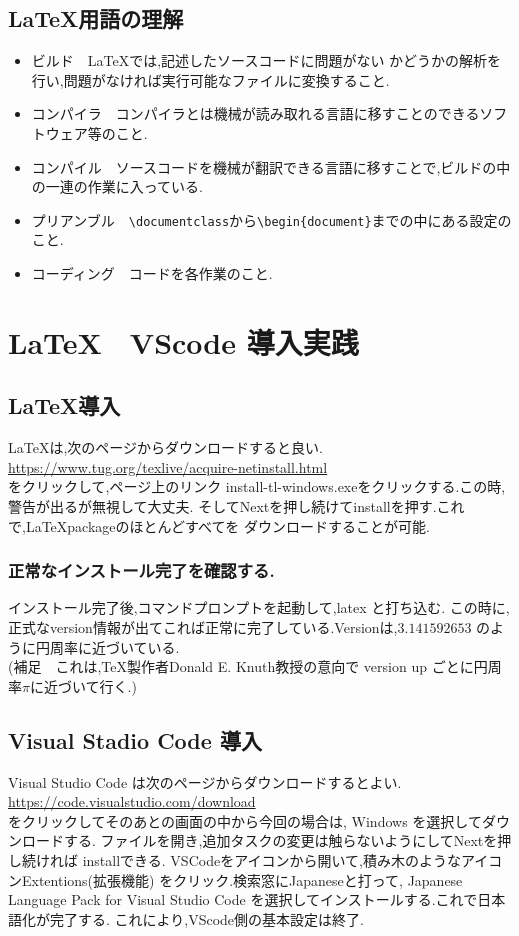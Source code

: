 \documentclass{ltjsarticle}
\begin{document}
\subsection{\LaTeX 用語の理解}
\begin{itemize}
  \item ビルド　\LaTeX では,記述したソースコードに問題がない
        かどうかの解析を行い,問題がなければ実行可能なファイルに変換すること.
  \item コンパイラ　コンパイラとは機械が読み取れる言語に移すことのできるソフトウェア等のこと.
  \item コンパイル　ソースコードを機械が翻訳できる言語に移すことで,ビルドの中の一連の作業に入っている.
  \item プリアンブル　\verb|\documentclass|から\verb|\begin{document}|までの中にある設定のこと.
  \item コーディング　コードを各作業のこと.
\end{itemize}


\section{\LaTeX　VScode 導入実践}

\subsection{\LaTeX 導入}
\LaTeX は,次のページからダウンロードすると良い.\\
\url{https://www.tug.org/texlive/acquire-netinstall.html}\\
をクリックして,ページ上のリンク install-tl-windows.exeをクリックする.この時,
警告が出るが無視して大丈夫.
そしてNextを押し続けてinstallを押す.これで,\LaTeX packageのほとんどすべてを
ダウンロードすることが可能.
\subsubsection*{正常なインストール完了を確認する.}
インストール完了後,コマンドプロンプトを起動して,latex と打ち込む.
この時に,正式なversion情報が出てこれば正常に完了している.Versionは,$3.141592653$
のように円周率に近づいている.\\
(補足　これは,\TeX 製作者Donald E. Knuth教授の意向で
version up ごとに円周率$\pi$に近づいて行く.)
\subsection{Visual Stadio Code 導入}
Visual Studio Code は次のページからダウンロードするとよい.\\
\url{https://code.visualstudio.com/download}\\
をクリックしてそのあとの画面の中から今回の場合は,
Windows を選択してダウンロードする.
ファイルを開き,追加タスクの変更は触らないようにしてNextを押し続ければ
installできる.
VSCodeをアイコンから開いて,積み木のようなアイコンExtentions(拡張機能)
をクリック.検索窓にJapaneseと打って,
Japanese Language Pack for Visual Studio Code
を選択してインストールする.これで日本語化が完了する.
これにより,VScode側の基本設定は終了.
\end{document}
